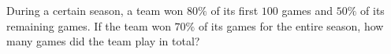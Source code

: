 During a certain season, a team won $80\%$ of its first $100$ games and $50\%$ of its remaining games. If the team won $70\%$ of its games for the entire season, how many games did the team play in total?
